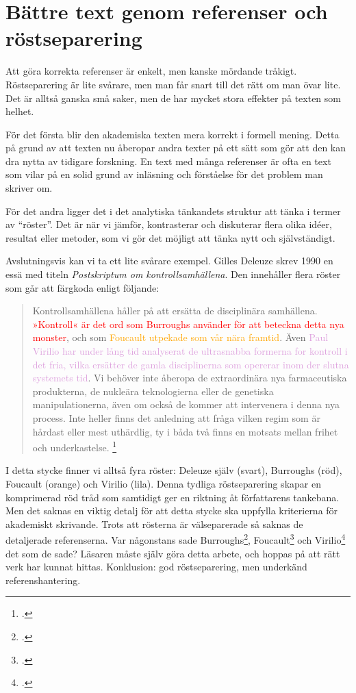 \documentclass[11pt,a4paper,footinclude=true,headinclude=true]{report} %
\begin{document}
\section{Bättre text genom referenser och röstseparering}

Att göra korrekta referenser är enkelt, men kanske mördande tråkigt. Röstseparering är lite svårare, men man får snart till det rätt om man övar lite. Det är alltså ganska små saker, men de har mycket stora effekter på texten som helhet. 

För det första blir den akademiska texten mera korrekt i formell mening. Detta på grund av att texten nu åberopar andra texter på ett sätt som gör att den kan dra nytta av tidigare forskning. En text med många referenser är ofta en text som vilar på en solid grund av inläsning och förståelse för det problem man skriver om. 

För det andra ligger det i det analytiska tänkandets struktur att tänka i termer av ``röster''. Det är när vi jämför, kontrasterar och diskuterar flera olika idéer, resultat eller metoder, som vi gör det möjligt att tänka nytt och självständigt. 

Avslutningsvis kan vi ta ett lite svårare exempel. Gilles Deleuze skrev 1990 en essä med titeln \textit{Postskriptum om kontrollsamhällena}. Den innehåller flera röster som går att färgkoda enligt följande: 

\begin{quote}
Kontrollsamhällena håller på att ersätta de disciplinära samhällena. \textcolor{red}{»Kontroll« är det ord som Burroughs använder för att beteckna detta nya monster}, och som \textcolor{orange}{Foucault utpekade som vår nära framtid}. Även \textcolor{Plum}{Paul Virilio har under lång tid analyserat de ultrasnabba formerna for kontroll i det fria, vilka ersätter de gamla disciplinerna som opererar inom der slutna systemets tid}. Vi behöver inte åberopa de extraordinära nya farmaceutiska produkterna, de nukleära teknologierna eller de genetiska manipulationerna, även om också de kommer att intervenera i denna nya process. Inte heller finns det anledning att fråga vilken regim som är hårdast eller mest uthärdlig, ty i båda två finns en motsats mellan frihet och underkastelse. \footcite[s. 185-6]{deleuzeNomadologin1998}
\end{quote}

I detta stycke finner vi alltså fyra röster: Deleuze själv (svart), Burroughs (röd), Foucault (orange) och Virilio (lila). Denna tydliga röstseparering skapar en komprimerad röd tråd som samtidigt ger en riktning åt författarens tankebana. Men det saknas en viktig detalj för att detta stycke ska uppfylla kriterierna för akademiskt skrivande. Trots att rösterna är välseparerade så saknas de detaljerade referenserna. Var någonstans sade Burroughs\footcite{burroughsElectronicRevolution2001}, Foucault\footcite{foucaultPowerKnowledgeSelected1981} och Virilio\footcite{virilioSpeedPolitics2006} det som de sade? Läsaren måste själv göra detta arbete, och hoppas på att rätt verk har kunnat hittas. Konklusion: god röstseparering, men underkänd referenshantering.
\end{document}
